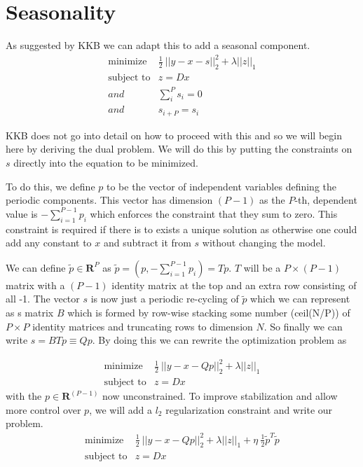 \documentclass{article}
\begin{document}
\section{Seasonality}

As suggested by KKB we can adapt this to add a seasonal component.
\begin{eqnarray}
\mbox{minimize} & \frac{1}{2} ~ || y - x -s||_2^2  + \lambda ||z||_1 \\
\mbox{subject to} & z = D x \\
and & \sum_i^P s_i = 0\\
and & s_{i+P} = s_i
\end{eqnarray}

KKB does not go into detail on how to proceed with this and so we will begin here by deriving
the dual problem. We will do this by putting the constraints on $s$ directly into the
equation to be minimized.

To do this, we define $p$ to be the vector of independent variables defining the periodic components.
This vector has dimension $(P-1)$ as the $P$-th, dependent value is $-\sum_{i=1}^{P-1} p_i$ which enforces the constraint that
they sum to zero. This constraint is required if there is to exists a unique solution as otherwise one could add
any constant to $x$ and subtract it from $s$ without changing the model.

We can define $\tilde{p} \in \mathbf{R}^{P}$ as $\tilde{p} = \left( p,-\sum_{i=1}^{P-1} p_i \right) = T p$.
$T$ will be a $P \times (P-1)$ matrix with a $(P-1)$ identity matrix at the top and an extra row consisting of all -1.
The vector $s$ is now just a periodic re-cycling of $\tilde{p}$ which we can represent as s matrix $B$ which is formed by
row-wise stacking some number (ceil(N/P)) of $P \times P$ identity matrices and truncating rows to dimension $N$. So finally
we can write $s = B T p \equiv Q p$. By doing this we can rewrite the optimization problem as

\begin{eqnarray}
\mbox{minimize} & \frac{1}{2} ~ || y - x - Q p||_2^2  + \lambda ||z||_1 \\
\mbox{subject to} & z = D x
\end{eqnarray}
with the $p \in \mathbf{R}^{(P-1)}$ now unconstrained. To improve stabilization and allow more control over $p$, we will add
a $l_2$ regularization constraint and write our problem.
\begin{eqnarray}
\mbox{minimize} & \frac{1}{2} ~ || y - x - Q p||_2^2  + \lambda ||z||_1 + \eta ~ \frac{1}{2} \tilde{p}^T \tilde{p}\\
\mbox{subject to} & z = D x
\end{eqnarray}
\end{document}
